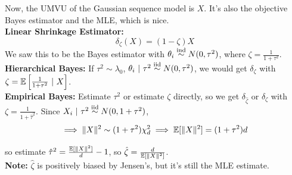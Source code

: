 Now, the UMVU of the Gaussian sequence model is $X$. It's also the objective Bayes estimator and the MLE, which is nice.\\

\textbf{Linear Shrinkage Estimator:}
\[ \delta_{\zeta}(X) = (1 - \zeta)X \]
We saw this to be the Bayes estimator with $\theta_i \overset{\tt{ind}}{\sim} N(0, \tau^2)$, where $\zeta = \frac{1}{1 + \tau^2}$.\\

\textbf{Hierarchical Bayes:} If $\tau^2 \sim \lambda_0$, $\theta_i \given \tau^2 \iidsim N(0, \tau^2)$, we would get $\delta_{\zeta}$ with $\zeta = \E\left[\frac{1}{1 + \tau^2} \given X\right]$.\\

\textbf{Empirical Bayes:} Estimate $\tau^2$ or estimate $\zeta$ directly, so we get $\delta_{\hat{\zeta}}$ or $\delta_{\zeta}$ with $\zeta = \frac{1}{1 + \hat{\tau}^2}$. Since $X_i \given \tau^2 \iidsim N(0, 1 + \tau^2)$,
\[ \implies \norm{X}^2 \sim (1 + \tau^2)\chi_d^2 \implies \E[\norm{X}^2] = (1 + \tau^2)d \]

so estimate $\hat{\tau}^2 = \frac{\E[\norm{X}^2]}{d} - 1$, so $\hat{\zeta} = \frac{d}{\E[\norm{X}^2]}$.\\

\textbf{Note:} $\hat{\zeta}$ is positively biased by Jensen's, but it's still the MLE estimate.


